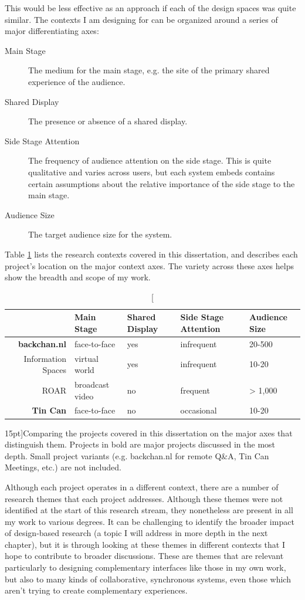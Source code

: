 This would be less effective as an approach if each of the design spaces was quite similar. The contexts I am designing for can be organized around a series of major differentiating axes:

\begin{description}
\item[Main Stage]{The medium for the main stage, e.g. the site of the primary shared experience of the audience.}
\item[Shared Display]{The presence or absence of a shared display.}
\item[Side Stage Attention]{The frequency of audience attention on the side stage. This is quite qualitative and varies across users, but each system embeds contains certain assumptions about the relative importance of the side stage to the main stage.}
\item[Audience Size]{The target audience size for the system.}
\end{description}

Table \ref{tab:project-axes} lists the research contexts covered in this dissertation, and describes each project's location on the major context axes. The variety across these axes helps show the breadth and scope of my work. 
\begin{table}[tb]

\begin{tabular}{r|llll}
& Main Stage & Shared Display & Side Stage Attention & Audience Size \\
\hline
\textbf{backchan.nl} & face-to-face & yes & infrequent & 20-500 \\
Information Spaces & virtual world & yes & infrequent & 10-20 \\
ROAR & broadcast video & no & frequent & > 1,000 \\
\textbf{Tin Can} & face-to-face & no & occasional & 10-20 \\
\end{tabular}
\label{tab:project-axes}
\caption[][15pt]{Comparing the projects covered in this dissertation on the major axes that distinguish them. Projects in bold are major projects discussed in the most depth. Small project variants (e.g. backchan.nl for remote Q\&A, Tin Can Meetings, etc.) are not included.}
\end{table}


Although each project operates in a different context, there are a number of research themes that each project addresses. Although these themes were not identified at the start of this research stream, they nonetheless are present in all my work to various degrees. It can be challenging to identify the broader impact of design-based research (a topic I will address in more depth in the next chapter), but it is through looking at these themes in different contexts that I hope to contribute to broader discussions. These are themes that are relevant particularly to designing complementary interfaces like those in my own work, but also to many kinds of collaborative, synchronous systems, even those which aren't trying to create complementary experiences.


